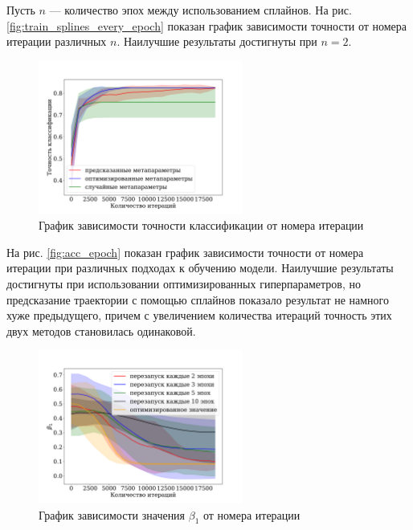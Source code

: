 \documentclass[12pt, twoside]{article}
\begin{document}
Пусть $n$ --- количество эпох между использованием сплайнов. На рис. \ref{fig:train_splines_every_epoch} показан график зависимости точности от номера итерации различных $n$. Наилучшие результаты достигнуты при $n=2$.

\begin{figure}[!ht]
    \centering
    \includegraphics[width=0.6\textwidth]{acc_iter.pdf}
    \caption{График зависимости точности классификации от номера итерации}
    \label{fig:acc_iter}
\end{figure}

На рис. \ref{fig:acc_epoch} показан график зависимости точности от номера итерации при различных подходах к обучению модели. Наилучшие результаты достигнуты при использовании оптимизированных гиперпараметров, но предсказание траектории с помощью сплайнов показало результат не намного хуже предыдущего, причем с увеличением количества итераций точность этих двух методов становилась одинаковой.

\begin{figure}[!ht]
    \centering
    \includegraphics[width=0.6\textwidth]{beta1_iter.pdf}
    \caption{График зависимости значения $\beta_1$ от номера итерации}
    \label{fig:beta1_it}
\end{figure}
\end{document}
